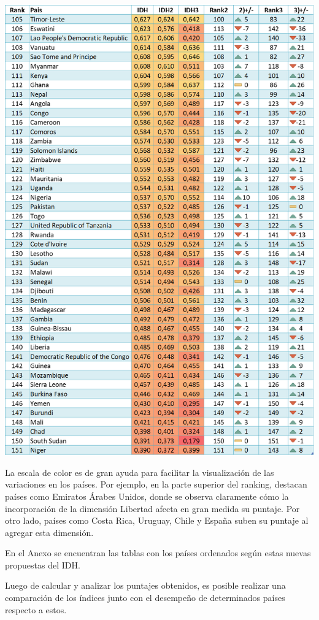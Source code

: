 \documentclass[
  10pt,
]{article}
\begin{document}
\begin{center}\includegraphics[width=14.92in]{Resultados/Tabla_IDH3} \end{center}

\pagebreak

La escala de color es de gran ayuda para facilitar la visualización de
las variaciones en los países. Por ejemplo, en la parte superior del
ranking, destacan países como Emiratos Árabes Unidos, donde se observa
claramente cómo la incorporación de la dimensión Libertad afecta en gran
medida su puntaje. Por otro lado, países como Costa Rica, Uruguay, Chile
y España suben su puntaje al agregar esta dimensión.

En el Anexo se encuentran las tablas con los países ordenados según
estas nuevas propuestas del IDH.

Luego de calcular y analizar los puntajes obtenidos, es posible realizar
una comparación de los índices junto con el desempeño de determinados
países respecto a estos.
\end{document}
